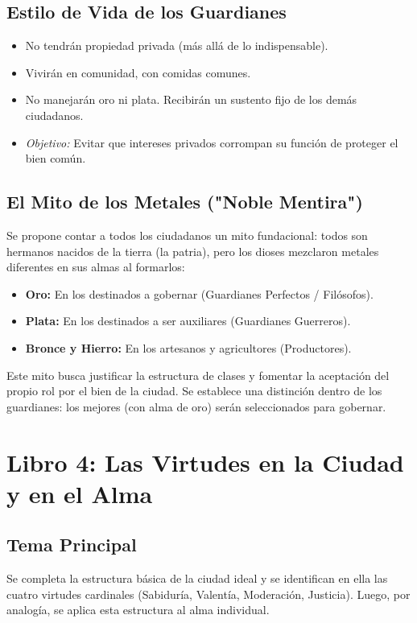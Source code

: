 \documentclass[11pt, a4paper]{article}
\begin{document}
\subsection*{Estilo de Vida de los Guardianes}
\begin{itemize}
    \item No tendrán propiedad privada (más allá de lo indispensable).
    \item Vivirán en comunidad, con comidas comunes.
    \item No manejarán oro ni plata. Recibirán un sustento fijo de los demás ciudadanos.
    \item \textit{Objetivo:} Evitar que intereses privados corrompan su función de proteger el bien común.
\end{itemize}

\subsection*{El Mito de los Metales ("Noble Mentira")}
Se propone contar a todos los ciudadanos un mito fundacional: todos son hermanos nacidos de la tierra (la patria), pero los dioses mezclaron metales diferentes en sus almas al formarlos:
\begin{itemize}
    \item \textbf{Oro:} En los destinados a gobernar (Guardianes Perfectos / Filósofos).
    \item \textbf{Plata:} En los destinados a ser auxiliares (Guardianes Guerreros).
    \item \textbf{Bronce y Hierro:} En los artesanos y agricultores (Productores).
\end{itemize}
Este mito busca justificar la estructura de clases y fomentar la aceptación del propio rol por el bien de la ciudad. Se establece una distinción dentro de los guardianes: los mejores (con alma de oro) serán seleccionados para gobernar.

\section*{Libro 4: Las Virtudes en la Ciudad y en el Alma}

\subsection*{Tema Principal}
Se completa la estructura básica de la ciudad ideal y se identifican en ella las cuatro virtudes cardinales (Sabiduría, Valentía, Moderación, Justicia). Luego, por analogía, se aplica esta estructura al alma individual.
\end{document}
